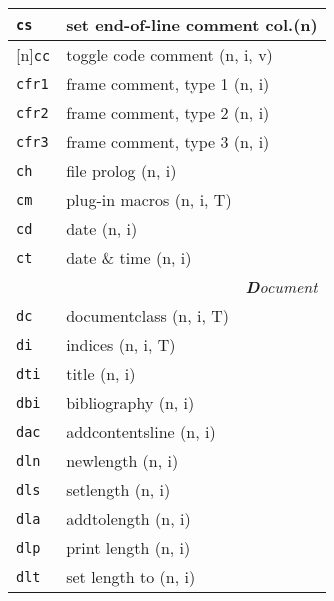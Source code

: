 \documentclass[oneside,10pt,landscape,DIV16]{scrartcl}
\newcommand{\Rep}{{\scriptsize{[n]}}}
\newcommand{\Map}[1] {\textbf{\textasciiacute}\texttt{#1}}
\begin{document}
\begin{multicols}{3}
\begin{center}
\begin{tabular}[]{|p{11mm}|p{60mm}|}
\hline     \Map{cs}   & set end-of-line comment col.\hfill (n)      \\
%
\hline \Rep\Map{cc}   & toggle code comment         \hfill (n, i, v)\\
%
\hline     \Map{cfr1} & frame comment, type 1       \hfill (n, i)   \\
\hline     \Map{cfr2} & frame comment, type 2       \hfill (n, i)   \\
\hline     \Map{cfr3} & frame comment, type 3       \hfill (n, i)   \\
\hline     \Map{ch}   & file prolog                 \hfill (n, i)   \\
\hline     \Map{cm}   & plug-in macros              \hfill (n, i, T)\\
\hline     \Map{cd}   & date                        \hfill (n, i)   \\
\hline     \Map{ct}   & date \& time                \hfill (n, i)   \\
\hline
\hline
\multicolumn{2}{|r|}{\textsl{\textbf{D}ocument}}                 \\[1.0ex]
\hline     \Map{dc}  &  documentclass               \hfill (n, i, T)\\
\hline     \Map{di}  &  indices                     \hfill (n, i, T)\\
\hline     \Map{dti} &  title                       \hfill (n, i)\\
\hline     \Map{dbi} &  bibliography                \hfill (n, i)\\
\hline     \Map{dac} &  addcontentsline             \hfill (n, i)\\
\hline
\hline     \Map{dln} &  newlength                   \hfill (n, i)\\
\hline     \Map{dls} &  setlength                   \hfill (n, i)\\
\hline     \Map{dla} &  addtolength                 \hfill (n, i)\\
\hline     \Map{dlp} &  print length                \hfill (n, i)\\
\hline     \Map{dlt} &  set length to               \hfill (n, i)\\
\hline
%
\end{tabular}\\
%

\end{center}
\end{multicols}
\end{document}
